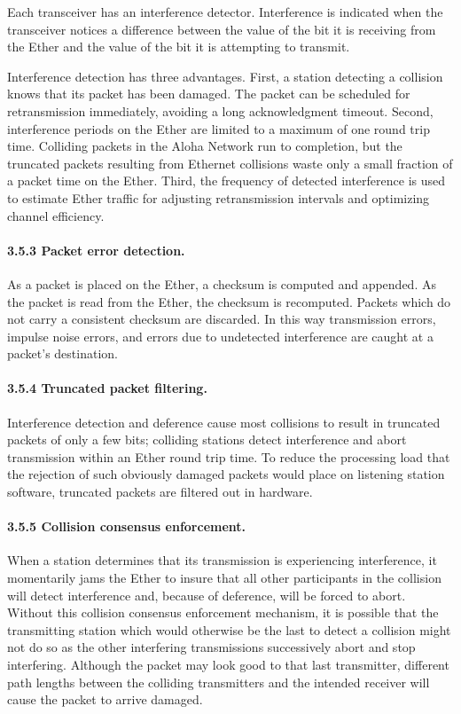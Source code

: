 Each transceiver has an interference detector. Interference is indicated when the transceiver notices a difference between the value of the bit it is receiving from the Ether and the value of the bit it is attempting to transmit.

Interference detection has three advantages. First, a station detecting a collision knows that its packet has been damaged. The packet can be scheduled for retransmission immediately, avoiding a long acknowledgment timeout. Second, interference periods on the Ether are limited to a maximum of one round trip time. Colliding packets in the Aloha Network run to completion, but the truncated packets resulting from Ethernet collisions waste only a small fraction of a packet time on the Ether. Third, the frequency of detected interference is used to estimate Ether traffic for adjusting retransmission intervals and optimizing channel efficiency.

\paragraph{3.5.3 Packet error detection.}

As a packet is placed on the Ether, a checksum is computed and appended. As the packet is read from the Ether, the checksum is recomputed. Packets which do not carry a consistent checksum are discarded. In this way transmission errors, impulse noise errors, and errors due to undetected interference are caught at a packet's destination.

\paragraph{3.5.4 Truncated packet filtering.}

Interference detection and deference cause most collisions to result in truncated packets of only a few bits; colliding stations detect interference and abort transmission within an Ether round trip time. To reduce the processing load that the rejection of such obviously damaged packets would place on listening station software, truncated packets are filtered out in hardware.

\paragraph{3.5.5 Collision consensus enforcement. }

When a station determines that its transmission is experiencing interference, it momentarily jams the Ether to insure that all other participants in the collision will detect interference and, because of deference, will be forced to abort. Without this collision consensus enforcement mechanism, it is possible that the transmitting station which would otherwise be the last to detect a collision might not do so as the other interfering transmissions successively
abort and stop interfering. Although the packet may look good to that last transmitter, different path lengths  between the colliding transmitters and the intended receiver will cause the packet to arrive damaged.


